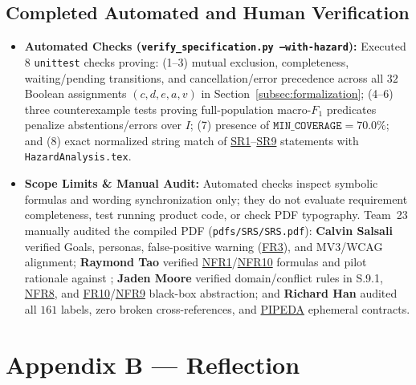 \documentclass[11pt]{article}
\newcommand{\PIPEDA}{\hyperlink{acr-pipeda}{PIPEDA}}
\begin{document}
\subsection*{Completed Automated and Human Verification}
\begin{itemize}[leftmargin=*, noitemsep]
    \item \textbf{Automated Checks (\texttt{verify\_specification.py --with-hazard}):} Executed $8$ \texttt{unittest} checks proving: (1--3) mutual exclusion, completeness, waiting/pending transitions, and cancellation/error precedence across all $32$ Boolean assignments $(c,d,e,a,v)$ in Section~\ref{subsec:formalization}; (4--6) three counterexample tests proving full-population macro-$F_1$ predicates penalize abstentions/errors over $I$; (7) presence of $\texttt{MIN\_COVERAGE} = 70.0\%$; and (8) exact normalized string match of \hyperref[SR1]{SR1}--\hyperref[SR9]{SR9} statements with \texttt{HazardAnalysis.tex}.
    \item \textbf{Scope Limits \& Manual Audit:} Automated checks inspect symbolic formulas and wording synchronization only; they do not evaluate requirement completeness, test running product code, or check PDF typography. Team~23 manually audited the compiled PDF (\texttt{pdfs/\allowbreak{}SRS/\allowbreak{}SRS.pdf}): \textbf{Calvin Salsali} verified Goals, personas, false-positive warning (\hyperref[FR3]{FR3}), and MV3/WCAG alignment; \textbf{Raymond Tao} verified \hyperref[NFR1]{NFR1}/\hyperref[NFR10]{NFR10} formulas and pilot rationale against \cite{VerityMLReport2026}; \textbf{Jaden Moore} verified domain/conflict rules in S.9.1, \hyperref[NFR8]{NFR8}, and \hyperref[FR10]{FR10}/\hyperref[NFR9]{NFR9} black-box abstraction; and \textbf{Richard Han} audited all $161$ labels, zero broken cross-references, and \PIPEDA{} ephemeral contracts.
\end{itemize}

\newpage

\section*{Appendix B --- Reflection}\label{sec:reflection}



\end{document}
